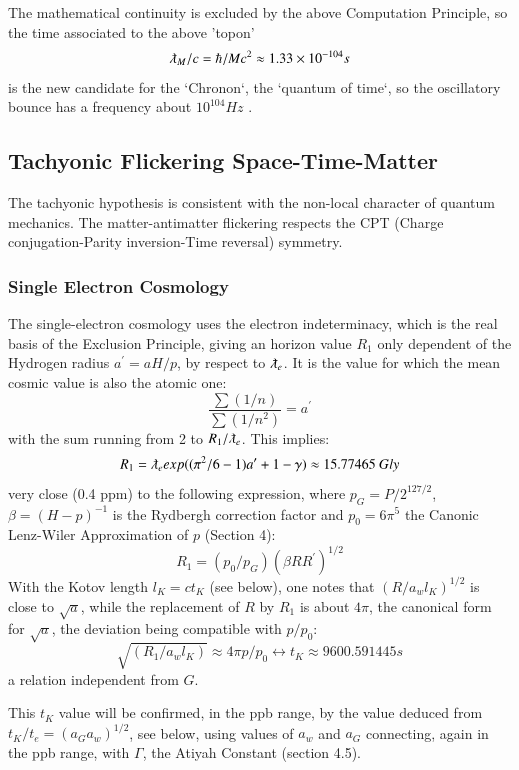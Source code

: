 \documentclass[twoside,draft]{article}
\begin{document}
\begin{sloppypar}
{The mathematical continuity is excluded by the above Computation Principle, so the time associated
to the above 'topon' 
$$\lambdabar_{M} /c = \hbar/Mc^2 \approx 1.33 \times 10^{-104}s$$
is the new candidate for the `Chronon`, the `quantum of time`, so the
oscillatory bounce has a frequency about $10^{104}Hz $ \cite{Sanchez2}.

\subsection{Tachyonic Flickering Space-Time-Matter}

The tachyonic hypothesis is consistent with the non-local character of quantum mechanics. The
matter-antimatter flickering respects the CPT (Charge conjugation-Parity inversion-Time reversal) symmetry.

\subsubsection{Single Electron Cosmology}

The single-electron cosmology \cite{Sanchez1} uses the electron indeterminacy, which is the real basis of the
Exclusion Principle, giving an horizon value $R_1$ only dependent of the Hydrogen radius $a^{\prime} = aH/p$, by respect to $\lambdabar_e$. It
is the value for which the mean cosmic value is also the atomic one:
\begin{equation}
\frac{\sum(1/n)}{\sum(1/n^{2})} = a^{\prime}
\end{equation}
with the sum running from 2 to $R_{1} /\lambdabar_{e}$. This implies:
$$R_{1} = \lambdabar_{e} exp((\pi^{2} /6 - 1)a^{\prime} + 1 - \gamma) \approx 15.77465 ~ Gly$$
very close (0.4 ppm) to the following expression, where $p_{G} = P/2^{127/2}$, $\beta = (H - p)^{-1}$ is the
Rydbergh correction factor and $p_{0} = 6\pi^{5}$ the Canonic Lenz-Wiler Approximation of $p$ (Section 4):
$$R_{1} = ( p_{0} /p_{G} )(\beta R R^{\prime})^{1/2}$$
With the Kotov length $l_{K} = ct_{K}$ (see below), one notes that $(R/a_w l_K)^{1/2} $ is close to $\sqrt{a}$, while
the replacement of $R$ by $R_{1}$ is about $4\pi$, the canonical form for $\sqrt{a}$, the deviation being compatible
with $p/p_{0}$:
$$\sqrt{(R_{1} /a_{w} l_{K})} \approx 4\pi p/p_{0} \leftrightarrow t_{K} \approx 9 600.591445 s$$ a relation independent from $G$. 

This $t_K$ value will be confirmed, in the ppb range, by the value
deduced from $t_{K} /t_{e} = (a_{G} a_{w})^{1/2}$, see below, using values of $a_{w}$ and $a_{G}$ connecting, again in the ppb
range, with $\Gamma$, the Atiyah Constant (section 4.5).

}
\end{sloppypar}
\end{document}
